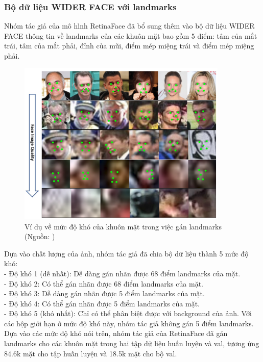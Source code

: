 {    \subsubsection*{Bộ dữ liệu WIDER FACE với landmarks}
    Nhóm tác giả của mô hình RetinaFace \cite{deng2020retinaface} đã bổ sung thêm vào bộ dữ liệu WIDER FACE thông tin về landmarks của các khuôn mặt bao gồm 5 điểm: tâm của mắt trái, tâm của mắt phải, đỉnh của mũi, điểm mép miệng trái và điểm mép miệng phải.

    \begin{figure}[H]
        \centering
        \includegraphics[width=10cm] {images/widerface_five_levels_lm_1}
        \caption{Ví dụ về mức độ khó của khuôn mặt trong việc gán landmarks (Nguồn: \cite{deng2020retinaface})}
        \label{fig:widerface_five_levels_lm_1}
    \end{figure}

    \noindent
    Dựa vào chất lượng của ảnh, nhóm tác giả đã chia bộ dữ liệu thành 5 mức độ khó: \\
    - Độ khó 1 (dễ nhất): Dễ dàng gán nhãn được 68 điểm landmarks của mặt. \\
    - Độ khó 2: Có thể gán nhãn được 68 điểm landmarks của mặt. \\
    - Độ khó 3: Dễ dàng gán nhãn được 5 điểm landmarks của mặt. \\
    - Độ khó 4: Có thể gán nhãn được 5 điểm landmarks của mặt. \\
    - Độ khó 5 (khó nhất): Chỉ có thể phân biệt được với background của ảnh. Với các hộp giới hạn ở mức độ khó này, nhóm tác giả không gán 5 điểm landmarks. \\
    Dựa vào các mức độ khó nói trên, nhóm tác giả của RetinaFace đã gán landmarks cho các khuôn mặt trong hai tập dữ liệu huấn luyện và val, tương ứng 84.6k mặt cho tập huấn luyện và 18.5k mặt cho bộ val.

}
